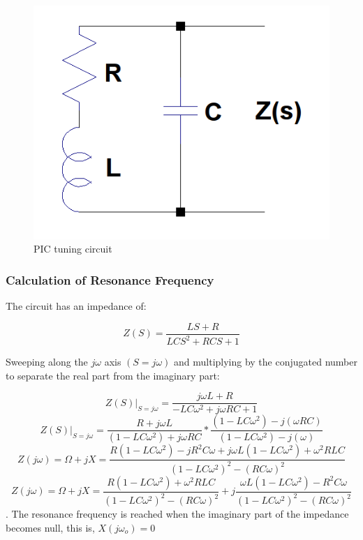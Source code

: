 \documentclass{article} %
\begin{document}
\begin{multicols}{2}
\begin{figure}[H]
\centering
\includegraphics[scale=0.25]{Images/ImagenesTesina/antena/Antena_Equivalente.png}
\caption{PIC tuning circuit}
\label{fig:antena_eq}
\end{figure}

\subsubsection{Calculation of Resonance Frequency}



The circuit has an impedance of:

\begin{equation}
Z(S) = \frac{LS + R}{LCS^2 + RCS + 1}
\end{equation}

%
%
Sweeping along the  $j\omega$ axis $(S = j\omega)$ and multiplying by the conjugated number to separate the real part from the imaginary part: 

{\tiny{
$$ Z(S)|_{S=j\omega} = \frac{j\omega L + R}{-LC\omega ^2 + j\omega RC + 1}$$
$$Z(S)|_{S=j\omega} = \frac{R + j\omega L}{(1 - LC\omega^2) + j\omega RC} * \frac{(1 - LC\omega ^2) - j(\omega RC)}{(1 - LC\omega ^2) - j(\omega)}$$
$$Z(j\omega) = \Omega + jX = \frac{R(1 - LC\omega ^2)-jR^2C\omega+j\omega L(1-LC\omega ^2)+\omega ^2 RLC}{(1 - LC\omega ^2)^2 - (RC\omega )^2}$$
$$Z(j\omega) = \Omega + jX = \frac{R(1 - LC\omega ^2)+\omega ^2RLC}{(1 - LC\omega ^2)^2 - (RC\omega )^2}+j\frac{\omega L(1 - LC\omega ^2)-R^2C\omega}{(1 - LC\omega ^2)^2 - (RC\omega )^2}$$
.}}
The resonance frequency is reached when the imaginary part of the impedance becomes null, this is, $X(j\omega _o) = 0$


\end{multicols}
\end{document}
